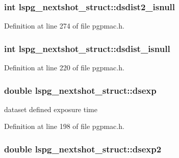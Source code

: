\hypertarget{structlspg__nextshot__struct_a7fce65f4719a4a8110006f8b72eec3f7}{
\subsubsection[{dsdist2\-\_\-isnull}]{\setlength{\rightskip}{0pt plus 5cm}int lspg\-\_\-nextshot\-\_\-struct\-::dsdist2\-\_\-isnull}}\label{structlspg__nextshot__struct_a7fce65f4719a4a8110006f8b72eec3f7}


Definition at line 274 of file pgpmac.\-h.

\hypertarget{structlspg__nextshot__struct_ac6f2bdc7b023d933509bf74af7b169f9}{
\subsubsection[{dsdist\-\_\-isnull}]{\setlength{\rightskip}{0pt plus 5cm}int lspg\-\_\-nextshot\-\_\-struct\-::dsdist\-\_\-isnull}}\label{structlspg__nextshot__struct_ac6f2bdc7b023d933509bf74af7b169f9}


Definition at line 220 of file pgpmac.\-h.

\hypertarget{structlspg__nextshot__struct_a063e4c99201a763c2eb048acfc855efa}{
\subsubsection[{dsexp}]{\setlength{\rightskip}{0pt plus 5cm}double lspg\-\_\-nextshot\-\_\-struct\-::dsexp}}\label{structlspg__nextshot__struct_a063e4c99201a763c2eb048acfc855efa}


dataset defined exposure time 



Definition at line 198 of file pgpmac.\-h.

\hypertarget{structlspg__nextshot__struct_a4d8c34309572875352ddabe9cc9001ee}{
\subsubsection[{dsexp2}]{\setlength{\rightskip}{0pt plus 5cm}double lspg\-\_\-nextshot\-\_\-struct\-::dsexp2}}\label{structlspg__nextshot__struct_a4d8c34309572875352ddabe9cc9001ee}


